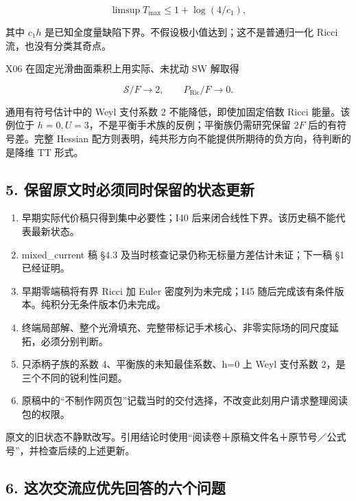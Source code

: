 \documentclass[
  10pt,
]{article}
\providecommand{\tightlist}{%
  \setlength{\itemsep}{0pt}\setlength{\parskip}{0pt}}
\begin{document}
\[
\limsup T_{\max}\le1+\log(4/c_1),
\]

其中 \(c_1h\) 是已知全度量缺陷下界。不假设极小值达到；这不是普通归一化
Ricci 流，也没有分类其奇点。

X06 在固定光滑曲面乘积上用实际、未扰动 SW 解取得

\[
\mathscr S/F\to2,\qquad P_{\mathrm{Ric}}/F\to0.
\]

通用有符号估计中的 Weyl 支付系数 2 不能降低，即使加固定倍数 Ricci
能量。该例位于 \(h=0,U=3\)，不是平衡手术族的反例；平衡族仍需研究保留
\(2F\) 后的有符号差。完整 Hessian
配方则表明，纯共形方向不能提供所期待的负方向，待判断的是降维 TT 形式。

\hypertarget{ux4fddux7559ux539fux6587ux65f6ux5fc5ux987bux540cux65f6ux4fddux7559ux7684ux72b6ux6001ux66f4ux65b0}{%
\subsection{5.
保留原文时必须同时保留的状态更新}\label{ux4fddux7559ux539fux6587ux65f6ux5fc5ux987bux540cux65f6ux4fddux7559ux7684ux72b6ux6001ux66f4ux65b0}}

\begin{enumerate}
\def\labelenumi{\arabic{enumi}.}
\tightlist
\item
  早期实际代价稿只得到集中必要性；I40
  后来闭合线性下界。该历史稿不能代表最新状态。
\item
  mixed\_current 稿 §4.3 及当时核查记录仍称无标量方差估计未证；下一稿 §1
  已经证明。
\item
  早期零端稿将有界 Ricci 加 Euler 密度列为未完成；I45
  随后完成该有条件版本。纯积分无条件版本仍未完成。
\item
  终端局部解、整个光滑填充、完整带标记手术核心、非零实际场的同尺度延拓，必须分别判断。
\item
  只添柄子族的系数 4、平衡族的未知最佳系数、h=0 上 Weyl 支付系数
  2，是三个不同的锐利性问题。
\item
  原稿中的``不制作网页包''记载当时的交付选择，不改变此刻用户请求整理阅读包的权限。
\end{enumerate}

原文的旧状态不静默改写。引用结论时使用``阅读卷＋原稿文件名＋原节号／公式号''，并检查后续的上述更新。

\hypertarget{ux8fd9ux6b21ux4ea4ux6d41ux5e94ux4f18ux5148ux56deux7b54ux7684ux516dux4e2aux95eeux9898}{%
\subsection{6.
这次交流应优先回答的六个问题}\label{ux8fd9ux6b21ux4ea4ux6d41ux5e94ux4f18ux5148ux56deux7b54ux7684ux516dux4e2aux95eeux9898}}
\end{document}
